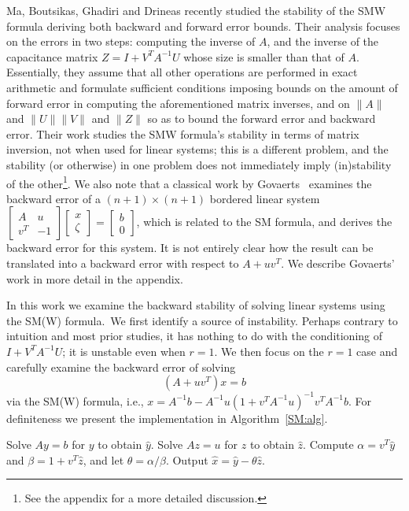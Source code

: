 \documentclass{siamltex}
\begin{document}
Ma, Boutsikas, Ghadiri and Drineas \cite{Ma25} recently studied the stability of the SMW formula deriving both backward and forward error bounds. 
Their analysis focuses on the errors in two steps: computing the inverse of $A$, and the inverse of the capacitance matrix $Z = I + V^T A^{-1} U$ whose size is smaller than that of $A$. Essentially, they assume that all other operations are performed in exact arithmetic and formulate sufficient conditions imposing bounds on the amount of forward error in computing the aforementioned matrix inverses, and on $\|A\|$ and $\|U\| \|V\|$ and $\|Z\|$ so as to bound the forward error and backward error. Their work studies the SMW formula's stability in terms of matrix inversion, not when used for linear systems; this is a different problem, and the stability (or otherwise) in one problem does not immediately imply (in)stability of the other\footnote{See the appendix for a more detailed discussion.}. We also note that a classical work by Govaerts~\cite{Govaerts91} examines the backward error of a $(n+1)\times (n+1)$ bordered linear system 
$\begin{bmatrix}
A & u \\
v^T & -1
\end{bmatrix}
\begin{bmatrix}
x \\
\zeta
\end{bmatrix} =
\begin{bmatrix}
b \\
0
\end{bmatrix}$, which is related to the SM formula, and derives the backward error for this system. It is not entirely clear how the result can be translated into a backward error with respect to $A+uv^T$. We describe Govaerts' work in more detail in the appendix.

In this work we examine the backward stability of solving linear systems using the SM(W) formula.\ We first identify a source of instability. Perhaps contrary to intuition and most prior studies, 
it has nothing to do with the conditioning of $I + V^T\!A^{-1}U$; it is unstable even when $r=1$. We then focus on the $r=1$ case and carefully examine the backward error of solving 
\begin{equation}  \label{eq:maingoal}
(A+uv^T)x = b  
\end{equation}
 via the SM(W) formula, i.e., $x = A^{-1}b - A^{-1}u(1 + v^T\!A^{-1}u)^{-1}v^T\! A^{-1}b$. For definiteness we present the implementation in Algorithm~\ref{SM:alg}. 
\begin{algorithm}[!h]
\caption{SM: Sherman-Morrison formula for solving $(A+uv^T)x = b$. It is assumed that linear systems with $A$ can be solved efficiently.}
\label{SM:alg}
\begin{algorithmic}[1]
\STATE Solve $Ay = b$ for $y$ to obtain $\hat y$. 
\STATE Solve $Az=u$ for $z$ to obtain $\hat z$.  
\STATE Compute $\alpha = v^T \hat y$ and $\beta = 1+v^T \hat z$, and let $\theta = \alpha / \beta$. 
\STATE Output $\hat x = \hat y - \theta \hat z$.
\end{algorithmic}
\end{algorithm}
\end{document}
